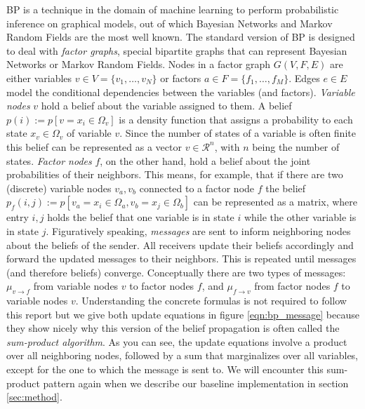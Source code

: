 BP is a technique in the domain of machine learning to perform probabilistic inference on graphical models, out of which Bayesian Networks and Mar\-kov Random Fields are the most well known. The standard version of BP is designed to deal with \textit{factor graphs}, special bipartite graphs that can represent Bayesian Networks or Markov Random Fields. Nodes in a factor graph $G(V,F,E)$ are either variables $v \in V = \{ v_1, \ldots, v_N \}$ or factors $a \in F = \{f_1, \ldots, f_M \}$. Edges $e\in E$ model the conditional dependencies between the variables (and factors).
\textit{Variable nodes} $v$ hold a belief about the variable assigned to them. A belief $p(i):=p[v=x_i\in\Omega_{v}]$ is a density function that assigns a probability to each state $x_v \in \Omega_v$ of variable $v$. Since the number of states of a variable is often finite this belief can be represented as a vector $v \in \mathcal{R}^n$, with $n$ being the number of states. 
\textit{Factor nodes} $f$, on the other hand, hold a belief about the joint probabilities of their neighbors. 
This means, for example, that if there are two (discrete) variable nodes $v_a, v_b$ connected to a factor node $f$ the belief $p_f(i,j) := p[v_a = x_i\in\Omega_a, v_b = x_j\in\Omega_b]$ can be represented as a matrix, where entry $i,j$ holds the belief that one variable is in state $i$ while the other variable is in state $j$. Figuratively speaking, \textit{messages} are sent to inform neighboring nodes about the beliefs of the sender. All receivers update their beliefs accordingly and forward the updated messages to their neighbors. This is repeated until messages (and therefore beliefs) converge. Conceptually there are two types of messages: $\mu_{v\rightarrow f}$ from variable nodes $v$ to factor nodes $f$, and $\mu_{f\rightarrow v}$ from factor nodes $f$ to variable nodes $v$. Understanding the concrete formulas is not required to follow this report but we give both update equations in figure \ref{eqn:bp_message} because they show nicely why this version of the belief propagation is often called the \textit{sum-product algorithm}. As you can see, the update equations involve a product over all neighboring nodes, followed by a sum that marginalizes over all variables, except for the one to which the message is sent to. We will encounter this sum-product pattern again when we describe our baseline implementation in section \ref{sec:method}.

